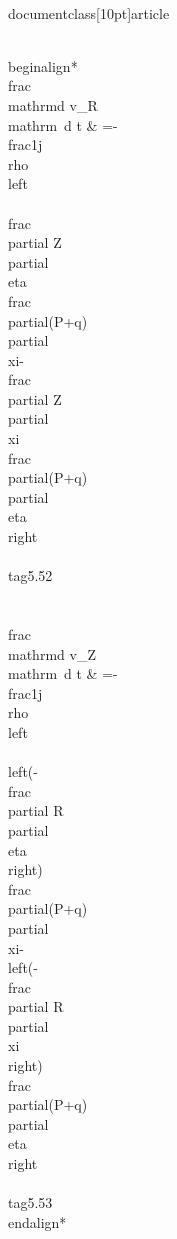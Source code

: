 \\documentclass[10pt]{article}
\begin{document}
{\\begin{align*}
\\frac{\\mathrm{d} v_{R}}{\\mathrm{~d} t} & =-\\frac{1}{j \\rho}\\left\\{\\frac{\\partial Z}{\\partial \\eta} \\frac{\\partial(P+q)}{\\partial \\xi}-\\frac{\\partial Z}{\\partial \\xi} \\frac{\\partial(P+q)}{\\partial \\eta}\\right\\}  \\tag{5.52}\\\\
\\frac{\\mathrm{d} v_{Z}}{\\mathrm{~d} t} & =-\\frac{1}{j \\rho}\\left\\{\\left(-\\frac{\\partial R}{\\partial \\eta}\\right) \\frac{\\partial(P+q)}{\\partial \\xi}-\\left(-\\frac{\\partial R}{\\partial \\xi}\\right) \\frac{\\partial(P+q)}{\\partial \\eta}\\right\\} \\tag{5.53}
\\end{align*}


}
\end{document}
